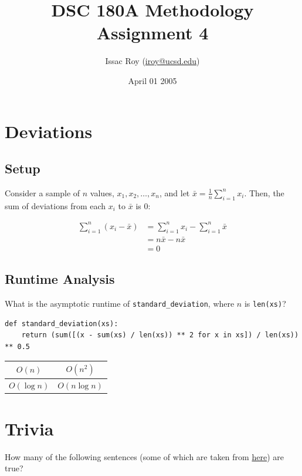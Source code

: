 \documentclass{article}
\title{DSC 180A Methodology Assignment 4}
\author{Issac Roy (\href{mailto:iroy@ucsd.edu}{iroy@ucsd.edu})}
\date{April 01 2005}
\begin{document}
\maketitle

\section{Deviations}
\subsection{Setup}

Consider a sample of $n$ values, $x_1, x_2, \ldots, x_n$, and let $\bar{x} = \frac{1}{n}\sum_{i=1}^n x_i$. Then, the sum of deviations from each $x_i$ to $\bar{x}$ is 0:

\begin{align*}
\sum_{i=1}^n (x_i - \bar{x}) &= \sum_{i=1}^n x_i - \sum_{i=1}^n \bar{x} \\
&= n\bar{x} - n\bar{x} \\
&= \boxed{0}
\end{align*}

\subsection{Runtime Analysis}

What is the asymptotic runtime of \texttt{standard\_deviation}, where $n$ is \texttt{len(xs)}?

\begin{verbatim}
def standard_deviation(xs):
    return (sum([(x - sum(xs) / len(xs)) ** 2 for x in xs]) / len(xs)) ** 0.5
\end{verbatim}

\begin{center}
\begin{tabular}{|c|c|}
\hline
$O(n)$ & $O(n^2)$ \\
\hline
$O(\log n)$ & $O(n \log n)$ \\
\hline
\end{tabular}
\end{center}

\section{Trivia}

How many of the following sentences (some of which are taken from \href{https://www.signupgenius.com/groups/true-or-false-questions.cfm}{here}) are true?
\end{document}
